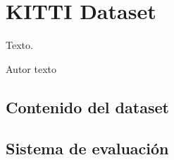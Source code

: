 \chapter{KITTI Dataset}
\label{cha:KITTI Dataset}

\begin{FraseCelebre}
  \begin{Frase}
    Texto.
  \end{Frase}
  \begin{Fuente}
    Autor texto
  \end{Fuente}
\end{FraseCelebre}

\section{Contenido del dataset}
\label{sec:Contenido del dataset}

\section{Sistema de evaluación}
\label{sec:Sistema de evaluación}

